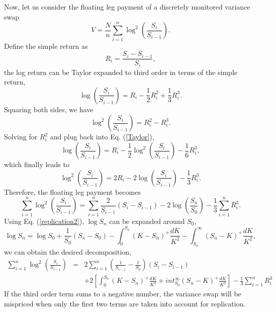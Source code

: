 \documentclass[12pt]{article}
\begin{document}
    Now, let us consider the floating leg payment of a discretely monitored variance swap \cite{CarrLee}
    \begin{equation}
      V = \frac{N}{n}\sum_{i=1}^n\log^2\left(\frac{S_i}{S_{i-1}}\right).
    \end{equation}
    Define the simple return as
    \begin{equation}
      R_i=\frac{S_i-S_{i-1}}{S_i},
    \end{equation}
    the log return can be Taylor expanded to third order in terms of the simple return,
    \begin{equation}
      \log\left(\frac{S_i}{S_{i-1}}\right)=R_i-\frac{1}{2}R_i^2+\frac{1}{3}R_i^3.
      \label{Taylor}
    \end{equation}
    Squaring both sides, we have
    \begin{equation}
      \log^2\left(\frac{S_i}{S_{i-1}}\right)=R_i^2-R_i^3.
    \end{equation}
    Solving for $R_i^2$ and plug back into Eq. (\ref{Taylor}),
    \begin{equation}
      \log\left(\frac{S_i}{S_{i-1}}\right)=R_i-\frac{1}{2}\log^2\left(\frac{S_i}{S_{i-1}}\right)-\frac{1}{6}R_i^3,
    \end{equation}
    which finally leads to
    \begin{equation}
      \log^2\left(\frac{S_i}{S_{i-1}}\right)=2R_i-2\log\left(\frac{S_i}{S_{i-1}}\right)-\frac{1}{3}R_i^3.
    \end{equation}
    Therefore, the floating leg payment becomes
    \begin{equation}
      \sum_{i=1}^n\log^2\left(\frac{S_i}{S_{i-1}}\right)=\sum_{i=1}^n\frac{2}{S_{i-1}}(S_i-S_{i-1})-2\log\left(\frac{S_n}{S_0}\right)-\frac{1}{3}\sum_{i=1}^nR_i^3.
    \end{equation}
    Using Eq. (\ref{replication2}), $\log S_n$ can be expanded around $S_0$,
    \begin{equation}
      \log S_n = \log S_0 +\frac{1}{S_0}\left(S_n-S_0\right)-\int_0^{S_0}\left(K-S_n\right)^+\frac{dK}{K^2}-\int_{S_0}^{\infty}\left(S_n-K\right)^+\frac{dK}{K^2},
    \end{equation}
    we can obtain the desired decomposition,
    \begin{eqnarray}
      \sum_{i=1}^n\log^2\left(\frac{S_i}{S_{i-1}}\right)&=&2\sum_{i=1}^n\left(\frac{1}{S_{i-1}}-\frac{1}{S_0}\right)(S_i-S_{i-1})\nonumber\\
          && + 2\left[\int_0^{S_0}\left(K-S_n\right)^+\frac{dK}{K^2}+int_{S_0}^{\infty}\left(S_n-K\right)^+\frac{dK}{K^2}\right]-\frac{1}{3}\sum_{i=1}^nR_i^3
    \end{eqnarray}
    If the third order term sums to a negative number, the variance swap will be mispriced when only the first two terms are
    taken into account for replication.
\end{document}
